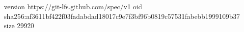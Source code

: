 version https://git-lfs.github.com/spec/v1
oid sha256:af3611bf422f03fadabdad18017c9e7f3bf96b0819c57531fabebb1999109b37
size 29920
